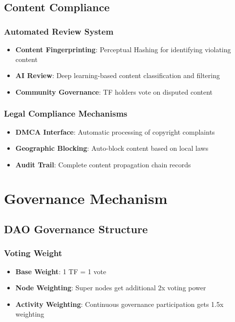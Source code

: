 \documentclass[12pt,a4paper]{article}
\begin{document}
\subsection{Content Compliance}

\subsubsection{Automated Review System}
\begin{itemize}
    \item \textbf{Content Fingerprinting}: Perceptual Hashing for identifying violating content
    \item \textbf{AI Review}: Deep learning-based content classification and filtering
    \item \textbf{Community Governance}: TF holders vote on disputed content
\end{itemize}

\subsubsection{Legal Compliance Mechanisms}
\begin{itemize}
    \item \textbf{DMCA Interface}: Automatic processing of copyright complaints
    \item \textbf{Geographic Blocking}: Auto-block content based on local laws
    \item \textbf{Audit Trail}: Complete content propagation chain records
\end{itemize}

\section{Governance Mechanism}

\subsection{DAO Governance Structure}

\subsubsection{Voting Weight}
\begin{itemize}
    \item \textbf{Base Weight}: 1 TF = 1 vote
    \item \textbf{Node Weighting}: Super nodes get additional 2x voting power
    \item \textbf{Activity Weighting}: Continuous governance participation gets 1.5x weighting
\end{itemize}
\end{document}
